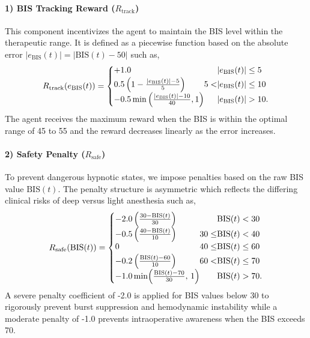 \documentclass[pdflatex,sn-mathphys-num]{sn-jnl}%
\theoremstyle{thmstyleone}%
\theoremstyle{thmstyletwo}%
\theoremstyle{thmstylethree}%
\begin{document}
\paragraph{1) BIS Tracking Reward ($R_{\text{track}}$)}
This component incentivizes the agent to maintain the BIS level within the therapeutic range. It is defined as a piecewise function based on the absolute error $|e_{\text{BIS}}(t)| = |\text{BIS}(t) - 50|$ such as,
\begin{equation}
R_{\text{track}}(e_{\text{BIS}}(t))=
\left\{
\begin{array}{@{}l@{}l@{}l@{\;}c@{\;}l@{}}
+1.0
  & \phantom{5<} & |e_{\text{BIS}}(t)| & \le & 5 \\[2pt]
0.5\left(1-\frac{|e_{\text{BIS}}(t)|-5}{5}\right)
  & 5< & |e_{\text{BIS}}(t)| & \le & 10 \\[2pt]
-0.5 \min\left(\frac{|e_{\text{BIS}}(t)|-10}{40}, 1\right)
  & \phantom{5<} & |e_{\text{BIS}}(t)| & > & 10.
\end{array}
\right.
\end{equation}
The agent receives the maximum reward when the BIS is within the optimal range of 45 to 55 and the reward decreases linearly as the error increases.

\paragraph{2) Safety Penalty ($R_{\text{safe}}$)}
To prevent dangerous hypnotic states, we impose penalties based on the raw BIS value $\text{BIS}(t)$. The penalty structure is asymmetric which reflects the differing clinical risks of deep versus light anesthesia such as,
\begin{equation*}
R_{\text{safe}}(\text{BIS}(t))=
\left\{
\begin{array}{@{}l@{}l@{}l@{\;}c@{\;}l@{}}
-2.0\left(\frac{30-\text{BIS}(t)}{30}\right)
  & \phantom{30\le} & \text{BIS}(t) & <  & 30 \\[2pt]

-0.5\left(\frac{40-\text{BIS}(t)}{10}\right)
  & 30 \le          & \text{BIS}(t) & <  & 40 \\[2pt]

0
  & 40 \le          & \text{BIS}(t) & \le & 60 \\[2pt]

-0.2\left(\frac{\text{BIS}(t)-60}{10}\right)
  & 60 <            & \text{BIS}(t) & \le & 70 \\[2pt]

-1.0 \min\!\left(\frac{\text{BIS}(t)-70}{30},\,1\right)
  & \phantom{30\le} & \text{BIS}(t) & >  & 70.
\end{array}
\right.
\end{equation*}
A severe penalty coefficient of -2.0 is applied for BIS values below 30 to rigorously prevent burst suppression and hemodynamic instability while a moderate penalty of -1.0 prevents intraoperative awareness when the BIS exceeds 70.
\end{document}
